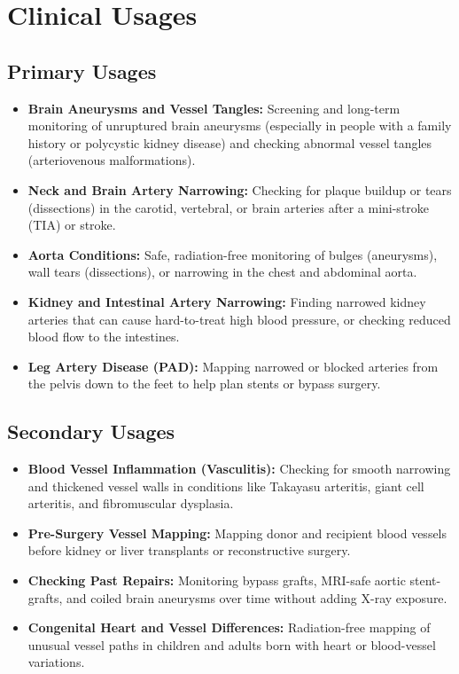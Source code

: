 \section{Clinical Usages}

\subsection{Primary Usages}
\begin{itemize}
\item \textbf{Brain Aneurysms and Vessel Tangles:} Screening and long-term monitoring of unruptured brain aneurysms (especially in people with a family history or polycystic kidney disease) and checking abnormal vessel tangles (arteriovenous malformations).
\item \textbf{Neck and Brain Artery Narrowing:} Checking for plaque buildup or tears (dissections) in the carotid, vertebral, or brain arteries after a mini-stroke (TIA) or stroke.
\item \textbf{Aorta Conditions:} Safe, radiation-free monitoring of bulges (aneurysms), wall tears (dissections), or narrowing in the chest and abdominal aorta.
\item \textbf{Kidney and Intestinal Artery Narrowing:} Finding narrowed kidney arteries that can cause hard-to-treat high blood pressure, or checking reduced blood flow to the intestines.
\item \textbf{Leg Artery Disease (PAD):} Mapping narrowed or blocked arteries from the pelvis down to the feet to help plan stents or bypass surgery.
\end{itemize}

\subsection{Secondary Usages}
\begin{itemize}
\item \textbf{Blood Vessel Inflammation (Vasculitis):} Checking for smooth narrowing and thickened vessel walls in conditions like Takayasu arteritis, giant cell arteritis, and fibromuscular dysplasia.
\item \textbf{Pre-Surgery Vessel Mapping:} Mapping donor and recipient blood vessels before kidney or liver transplants or reconstructive surgery.
\item \textbf{Checking Past Repairs:} Monitoring bypass grafts, MRI-safe aortic stent-grafts, and coiled brain aneurysms over time without adding X-ray exposure.
\item \textbf{Congenital Heart and Vessel Differences:} Radiation-free mapping of unusual vessel paths in children and adults born with heart or blood-vessel variations.
\end{itemize}

